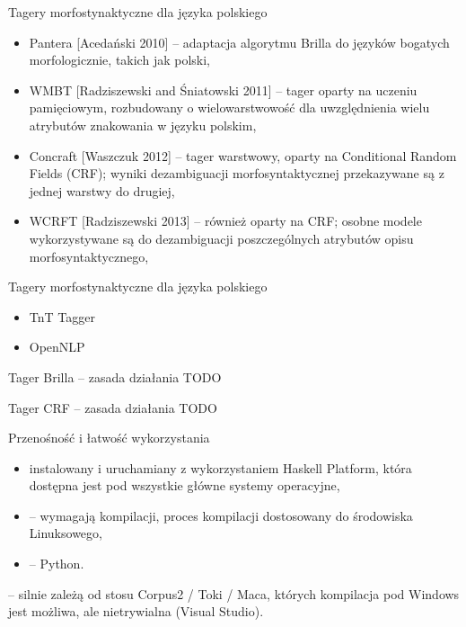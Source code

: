 \documentclass{beamer}
\begin{document}
\begin{frame}{Tagery morfostynaktyczne dla języka polskiego}
\begin{itemize}
\item Pantera [Acedański 2010] -- adaptacja algorytmu Brilla do języków bogatych morfologicznie, takich jak polski,
\item WMBT [Radziszewski and Śniatowski 2011] -- tager oparty na uczeniu pamięciowym, rozbudowany o wielowarstwowość dla uwzględnienia wielu atrybutów znakowania w języku polskim,
\item Concraft [Waszczuk 2012] -- tager warstwowy, oparty na Conditional Random Fields (CRF); wyniki dezambiguacji morfosyntaktycznej przekazywane są z jednej warstwy do drugiej,
\item WCRFT [Radziszewski 2013] -- również oparty na CRF; osobne modele wykorzystywane są do dezambiguacji poszczególnych atrybutów opisu morfosyntaktycznego,
\end{itemize}
\end{frame}

\begin{frame}{Tagery morfostynaktyczne dla języka polskiego}
\begin{itemize}
\item TnT Tagger
\item OpenNLP
\end{itemize}
\end{frame}

\begin{frame}{Tager Brilla -- zasada działania}
  TODO
\end{frame}

\begin{frame}{Tager CRF -- zasada działania}
  TODO
\end{frame}

\begin{frame}{Przenośność i łatwość wykorzystania}
  \begin{itemize}
    \item {} instalowany i uruchamiany z wykorzystaniem Haskell Platform, która dostępna jest pod wszystkie główne systemy operacyjne,
    \item {} -- wymagają kompilacji, proces kompilacji dostosowany do środowiska Linuksowego,
    \item {} -- Python.
  \end{itemize}
  \vspace{1cm}

   -- silnie zależą od stosu Corpus2 / Toki / Maca, których kompilacja pod Windows jest możliwa, ale nietrywialna (Visual Studio).
\end{frame}
\end{document}
